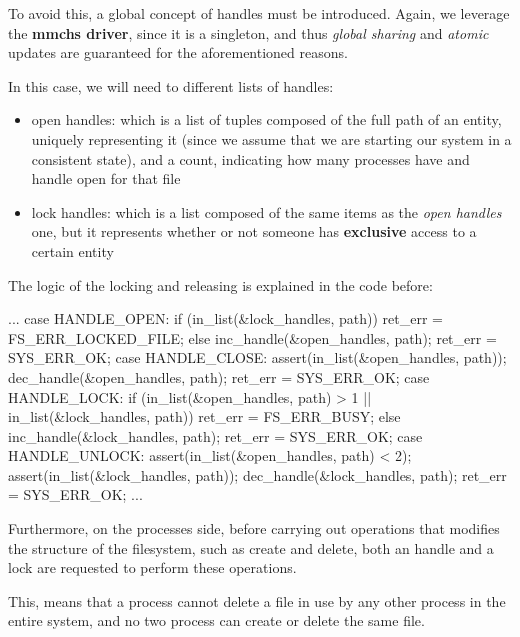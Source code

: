 \documentclass[a4paper,twoside,openright]{report}
\begin{document}
To avoid this, a global concept of handles must be introduced.
Again, we leverage the \textbf{mmchs driver}, since it is a singleton, and thus \emph{global sharing} and \emph{atomic} updates are guaranteed for the aforementioned reasons.

In this case, we will need to different lists of handles:
\begin{itemize}
    \item open handles: which is a list of tuples composed of the full path of an entity, uniquely representing it (since we assume that we are starting our system in a consistent state), and a count, indicating how many processes have and handle open for that file
    \item lock handles: which is a list composed of the same items as the \emph{open handles} one, but it represents whether or not someone has \textbf{exclusive} access to a certain entity
\end{itemize}

The logic of the locking and releasing is explained in the code before:
\begin{pandacode}
...
case HANDLE_OPEN:
    if (in_list(&lock_handles, path)) ret_err = FS_ERR_LOCKED_FILE;
    else {
        inc_handle(&open_handles, path);
        ret_err = SYS_ERR_OK;
    }
case HANDLE_CLOSE:
    assert(in_list(&open_handles, path));
    dec_handle(&open_handles, path);
    ret_err = SYS_ERR_OK;
case HANDLE_LOCK:
    if (in_list(&open_handles, path) > 1 || in_list(&lock_handles, path)) {
        ret_err = FS_ERR_BUSY;
    } else {
        inc_handle(&lock_handles, path);
        ret_err = SYS_ERR_OK;
    }
case HANDLE_UNLOCK:
    assert(in_list(&open_handles, path) < 2);
    assert(in_list(&lock_handles, path));
    dec_handle(&lock_handles, path);
    ret_err = SYS_ERR_OK;
...
\end{pandacode} 

Furthermore, on the processes side, before carrying out operations that modifies the structure of the filesystem, such as create and delete, both an handle and a lock are requested to perform these operations.

This, means that a process cannot delete a file in use by any other process in the entire system, and no two process can create or delete the same file.
\end{document}
